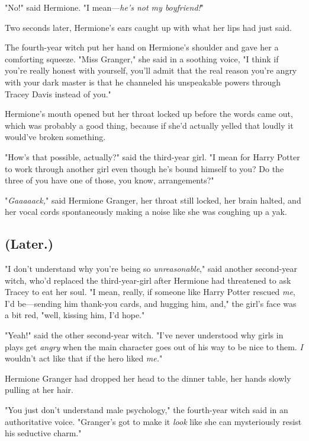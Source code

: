 "No!" said Hermione. "I mean---\emph{he's not my boyfriend!}"

Two seconds later, Hermione's ears caught up with what her lips had just said.

The fourth-year witch put her hand on Hermione's shoulder and gave her a
comforting squeeze. "Miss Granger," she said in a soothing voice, "I think if
you're really honest with yourself, you'll admit that the real reason you're
angry with your dark master is that he channeled his unspeakable powers through
Tracey Davis instead of you."

Hermione's mouth opened but her throat locked up before the words came out,
which was probably a good thing, because if she'd actually yelled that loudly
it would've broken something.

"How's that possible, actually?" said the third-year girl. "I mean for Harry
Potter to work through another girl even though he's bound himself to you? Do
the three of you have one of those, you know, arrangements?"

"\emph{Gaaaaack,}" said Hermione Granger, her throat still locked, her brain
halted, and her vocal cords spontaneously making a noise like she was coughing
up a yak.
\sbreak
\vspace{-2\baselineskip}
\subsection{(Later.)}

"I don't understand why you're being so \emph{unreasonable}," said another
second-year witch, who'd replaced the third-year-girl after Hermione had
threatened to ask Tracey to eat her soul. "I mean, really, if someone like
Harry Potter rescued \emph{me}, I'd be---sending him thank-you cards, and
hugging him, and," the girl's face was a bit red, "well, kissing him, I'd hope."

"Yeah!" said the other second-year witch. "I've never understood why girls in
plays get \emph{angry} when the main character goes out of his way to be nice
to them. \emph{I} wouldn't act like that if the hero liked \emph{me.}"

Hermione Granger had dropped her head to the dinner table, her hands slowly
pulling at her hair.

"You just don't understand male psychology," the fourth-year witch said in an
authoritative voice. "Granger's got to make it \emph{look} like she can
mysteriously resist his seductive charm."
\sbreak
\vspace{-2\baselineskip}
